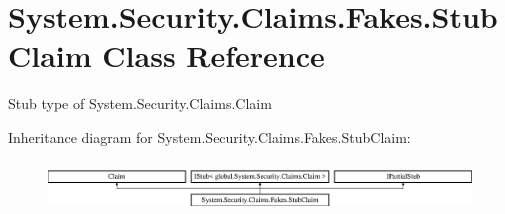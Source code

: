 \hypertarget{class_system_1_1_security_1_1_claims_1_1_fakes_1_1_stub_claim}{\section{System.\-Security.\-Claims.\-Fakes.\-Stub\-Claim Class Reference}
\label{class_system_1_1_security_1_1_claims_1_1_fakes_1_1_stub_claim}
}


Stub type of System.\-Security.\-Claims.\-Claim 


Inheritance diagram for System.\-Security.\-Claims.\-Fakes.\-Stub\-Claim\-:\begin{figure}[H]
\begin{center}
\leavevmode
\includegraphics[height=1.347774cm]{class_system_1_1_security_1_1_claims_1_1_fakes_1_1_stub_claim}
\end{center}
\end{figure}
